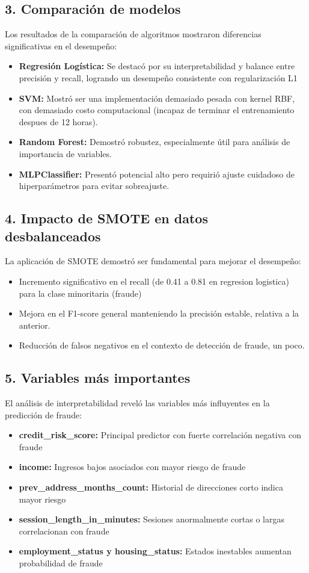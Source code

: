 \documentclass{llncs}
\begin{document}
\subsection{3. Comparación de modelos}

Los resultados de la comparación de algoritmos mostraron diferencias significativas en el desempeño:

\begin{itemize}
    \item \textbf{Regresión Logística:} Se destacó por su interpretabilidad y balance entre precisión y recall, logrando un desempeño consistente con regularización L1
    \item \textbf{SVM:} Mostró ser una implementación demasiado pesada con kernel RBF, con demasiado costo computacional (incapaz de terminar el entrenamiento despues de 12 horas).
    \item \textbf{Random Forest:} Demostró robustez, especialmente útil para análisis de importancia de variables.
    \item \textbf{MLPClassifier:} Presentó potencial alto pero requirió ajuste cuidadoso de hiperparámetros para evitar sobreajuste.
\end{itemize}

\subsection{4. Impacto de SMOTE en datos desbalanceados}

La aplicación de SMOTE demostró ser fundamental para mejorar el desempeño:
\begin{itemize}
    \item Incremento significativo en el recall (de 0.41 a 0.81 en regresion logistica) para la clase minoritaria (fraude)
    \item Mejora en el F1-score general manteniendo la precisión estable, relativa a la anterior.
    \item Reducción de falsos negativos en el contexto de detección de fraude, un poco.
\end{itemize}

\subsection{5. Variables más importantes}

El análisis de interpretabilidad reveló las variables más influyentes en la predicción de fraude:
\begin{itemize}
    \item \textbf{credit\_risk\_score:} Principal predictor con fuerte correlación negativa con fraude
    \item \textbf{income:} Ingresos bajos asociados con mayor riesgo de fraude
    \item \textbf{prev\_address\_months\_count:} Historial de direcciones corto indica mayor riesgo
    \item \textbf{session\_length\_in\_minutes:} Sesiones anormalmente cortas o largas correlacionan con fraude
    \item \textbf{employment\_status y housing\_status:} Estados inestables aumentan probabilidad de fraude
\end{itemize}
\end{document}
